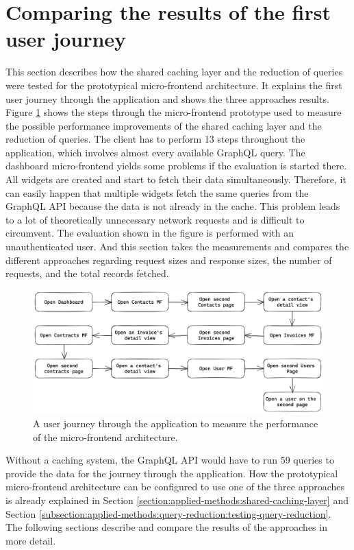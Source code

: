\section{Comparing the results of the first user journey}\label{section:results:comparison-first-journey}

This section describes how the shared caching layer and the reduction of queries were tested for the prototypical micro-frontend architecture. It explains the first user journey through the application and shows the three approaches results. Figure \ref{fig:results:evaluation-first-path} shows the steps through the micro-frontend prototype used to measure the possible performance improvements of the shared caching layer and the reduction of queries. The client has to perform 13 steps throughout the application, which involves almost every available GraphQL query. The dashboard micro-frontend yields some problems if the evaluation is started there. All widgets are created and start to fetch their data simultaneously. Therefore, it can easily happen that multiple widgets fetch the same queries from the GraphQL \ac{API} because the data is not already in the cache. This problem leads to a lot of theoretically unnecessary network requests and is difficult to circumvent. The evaluation shown in the figure is performed with an unauthenticated user. And this section takes the measurements and compares the different approaches regarding request sizes and response sizes, the number of requests, and the total records fetched.


\ifshowImages
\begin{figure}[H]
\centering
\includegraphics[width=1\linewidth]{images/results/evaluation-first-path.png}
\caption{A user journey through the application to measure the performance of the micro-frontend architecture.}\label{fig:results:evaluation-first-path}
\end{figure}
\fi

\noindent Without a caching system, the GraphQL \ac{API} would have to run 59 queries to provide the data for the journey through the application. How the prototypical micro-frontend architecture can be configured to use one of the three approaches is already explained in Section \ref{section:applied-methods:shared-caching-layer} and Section \ref{subsection:applied-methods:query-reduction:testing-query-reduction}. The following sections describe and compare the results of the approaches in more detail.

